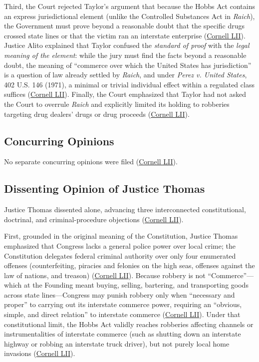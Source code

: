 \documentclass[12pt]{article}
\begin{document}
Third, the Court rejected Taylor's argument that because the Hobbs Act contains an express jurisdictional element (unlike the Controlled Substances Act in \textit{Raich}), the Government must prove beyond a reasonable doubt that the specific drugs crossed state lines or that the victim ran an interstate enterprise (\href{https://www.law.cornell.edu/supremecourt/text/14-6166}{Cornell LII}). Justice Alito explained that Taylor confused the \textit{standard of proof} with the \textit{legal meaning of the element}: while the jury must find the facts beyond a reasonable doubt, the meaning of ``commerce over which the United States has jurisdiction'' is a question of law already settled by \textit{Raich}, and under \textit{Perez v. United States}, 402 U.S. 146 (1971), a minimal or trivial individual effect within a regulated class suffices (\href{https://www.law.cornell.edu/supremecourt/text/14-6166}{Cornell LII}). Finally, the Court emphasized that Taylor had not asked the Court to overrule \textit{Raich} and explicitly limited its holding to robberies targeting drug dealers' drugs or drug proceeds (\href{https://www.law.cornell.edu/supremecourt/text/14-6166}{Cornell LII}).

\subsection{Concurring Opinions}
No separate concurring opinions were filed (\href{https://www.law.cornell.edu/supremecourt/text/14-6166}{Cornell LII}).

\subsection{Dissenting Opinion of Justice Thomas}
Justice Thomas dissented alone, advancing three interconnected constitutional, doctrinal, and criminal-procedure objections (\href{https://www.law.cornell.edu/supremecourt/text/14-6166}{Cornell LII}).

First, grounded in the original meaning of the Constitution, Justice Thomas emphasized that Congress lacks a general police power over local crime; the Constitution delegates federal criminal authority over only four enumerated offenses (counterfeiting, piracies and felonies on the high seas, offenses against the law of nations, and treason) (\href{https://www.law.cornell.edu/supremecourt/text/14-6166}{Cornell LII}). Because robbery is not ``Commerce''---which at the Founding meant buying, selling, bartering, and transporting goods across state lines---Congress may punish robbery only when ``necessary and proper'' to carrying out its interstate commerce power, requiring an ``obvious, simple, and direct relation'' to interstate commerce (\href{https://www.law.cornell.edu/supremecourt/text/14-6166}{Cornell LII}). Under that constitutional limit, the Hobbs Act validly reaches robberies affecting channels or instrumentalities of interstate commerce (such as shutting down an interstate highway or robbing an interstate truck driver), but not purely local home invasions (\href{https://www.law.cornell.edu/supremecourt/text/14-6166}{Cornell LII}).
\end{document}
